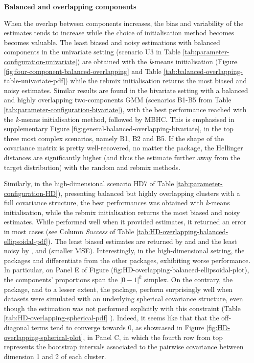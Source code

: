 \textbf{Balanced and overlapping components}

When the overlap between components increases, the bias and variability of the estimates tends to increase while the choice of initialisation method becomes becomes valuable.
The least biased and noisy estimations with balanced components in the univariate setting (scenario U3 in Table
\ref{tab:parameter-configuration-univariate}) are obtained with
the \emph{k}-means initialisation (Figure
\ref{fig:four-component-balanced-overlapping} and Table
\ref{tab:balanced-overlapping-table-univariate-pdf}) while
the rebmix initialisation returns the most biased and noisy
estimates. Similar results are found in the bivariate setting with a balanced and highly overlapping two-components GMM (scenarios B1-B5 from Table \ref{tab:parameter-configuration-bivariate}), with the best performance reached with the \emph{k}-means initialisation method, followed by MBHC. This is emphasised in supplementary Figure \ref{fig:general-balanced-overlapping-bivariate}, in the top three most complex scenarios, namely B1, B2 and B5. If the shape of the covariance matrix is pretty well-recovered, no matter the package, the Hellinger distances are significantly higher (and thus the estimate further away from the target distribution) with the random and rebmix methods.

\color{blue}

Similarly, in the high-dimensional scenario HD7 of Table \ref{tab:parameter-configuration-HD}), presenting balanced but highly overlapping clusters with a full covariance structure, the best performances was obtained with \emph{k}-means initialisation, while the rebmix initialisation returns the most biased and noisy estimates. While  performed well when it provided estimates, it returned an error in most cases (see Column \emph{Success} of Table \ref{tab:HD-overlapping-balanced-ellipsoidal-pdf}). The least biased estimates are returned by  and  and the least noisy by ,  and  (smaller MSE). Interestingly, in the high-dimensional setting, the packages  and  differentiate from the other packages, exhibiting worse performance. In particular, on Panel E of Figure (fig:HD-overlapping-balanced-ellipsoidal-plot), the components' proportions span the \(]0-1[^k\) simplex.
On the contrary, the  package, and to a lesser extent, the  package, perform surprisingly well when datasets were simulated with an underlying spherical covariance structure, even though the estimation was not performed explicitly with this constraint (Table \ref{tab:HD-overlapping-spherical-pdf}
). Indeed, it seems like that that the off-diagonal terms tend to converge towards 0, as showcased in Figure \ref{fig:HD-overlapping-spherical-plot}, in Panel C, in which the fourth row from top represents the bootstrap intervals associated to the pairwise covariance between dimension 1 and 2 of each cluster.\\
\color{black}

